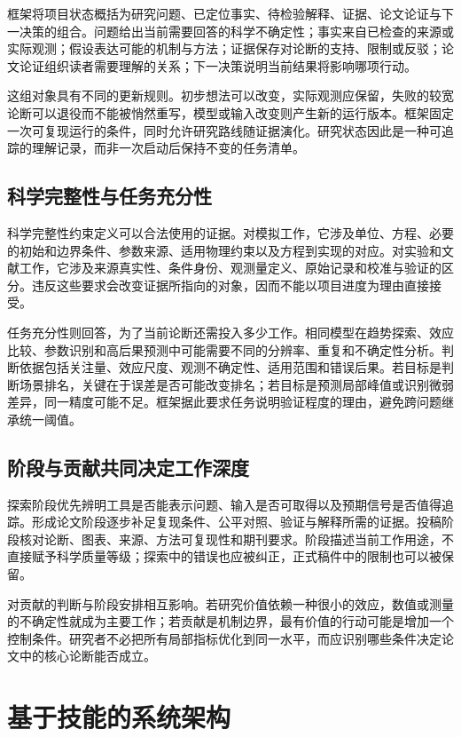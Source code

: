 \documentclass[UTF8,fontset=fandol,a4paper,11pt]{ctexart}
\begin{document}
框架将项目状态概括为研究问题、已定位事实、待检验解释、证据、论文论证与下一决策的组合。问题给出当前需要回答的科学不确定性；事实来自已检查的来源或实际观测；假设表达可能的机制与方法；证据保存对论断的支持、限制或反驳；论文论证组织读者需要理解的关系；下一决策说明当前结果将影响哪项行动。

这组对象具有不同的更新规则。初步想法可以改变，实际观测应保留，失败的较宽论断可以退役而不能被悄然重写，模型或输入改变则产生新的运行版本。框架固定一次可复现运行的条件，同时允许研究路线随证据演化。研究状态因此是一种可追踪的理解记录，而非一次启动后保持不变的任务清单。

\subsection{科学完整性与任务充分性}

科学完整性约束定义可以合法使用的证据。对模拟工作，它涉及单位、方程、必要的初始和边界条件、参数来源、适用物理约束以及方程到实现的对应。对实验和文献工作，它涉及来源真实性、条件身份、观测量定义、原始记录和校准与验证的区分。违反这些要求会改变证据所指向的对象，因而不能以项目进度为理由直接接受。

任务充分性则回答，为了当前论断还需投入多少工作。相同模型在趋势探索、效应比较、参数识别和高后果预测中可能需要不同的分辨率、重复和不确定性分析。判断依据包括关注量、效应尺度、观测不确定性、适用范围和错误后果。若目标是判断场景排名，关键在于误差是否可能改变排名；若目标是预测局部峰值或识别微弱差异，同一精度可能不足。框架据此要求任务说明验证程度的理由，避免跨问题继承统一阈值。

\subsection{阶段与贡献共同决定工作深度}

探索阶段优先辨明工具是否能表示问题、输入是否可取得以及预期信号是否值得追踪。形成论文阶段逐步补足复现条件、公平对照、验证与解释所需的证据。投稿阶段核对论断、图表、来源、方法可复现性和期刊要求。阶段描述当前工作用途，不直接赋予科学质量等级；探索中的错误也应被纠正，正式稿件中的限制也可以被保留。

对贡献的判断与阶段安排相互影响。若研究价值依赖一种很小的效应，数值或测量的不确定性就成为主要工作；若贡献是机制边界，最有价值的行动可能是增加一个控制条件。研究者不必把所有局部指标优化到同一水平，而应识别哪些条件决定论文中的核心论断能否成立。

\section{基于技能的系统架构}
\end{document}
